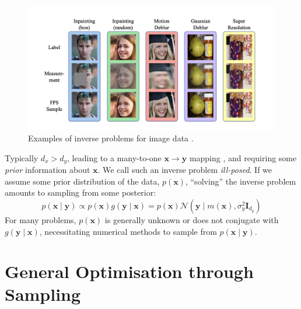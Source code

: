 \begin{figure}[htbp]
    \centering
    \includegraphics[width=1\textwidth]{assets/inverse_problems.png}
    \caption{Examples of inverse problems for image data \parencite{douDiffusionPosteriorSampling2023}.}
    \label{fig:inverse-problems}
\end{figure}

\begin{remark}
    Typically $d_x > d_y$, leading to a many-to-one $\mathbf{x} \rightarrow \mathbf{y}$ mapping
    \parencite{chungDiffusionPosteriorSampling2022}, and requiring some \emph{prior} information
    about $\mathbf{x}$. We call such an inverse problem \emph{ill-posed}. If we assume some prior
    distribution of the data, $p(\mathbf{x})$, ``solving'' the inverse problem amounts to sampling
    from some posterior:
    \begin{equation*}
        p(\mathbf{x} \mid \mathbf{y}) \propto p(\mathbf{x})g(\mathbf{y} \mid \mathbf{x})
        = p(\mathbf{x})\mathcal{N}\left(\mathbf{y} \mid m(\mathbf{x}), \sigma^2_y\mathbf{I}_{d_y}\right)
    \end{equation*}
    For many problems, $p(\mathbf{x})$ is generally unknown or does not conjugate with
    $g(\mathbf{y} \mid \mathbf{x})$, necessitating numerical methods to sample from
    $p(\mathbf{x} \mid \mathbf{y})$.
\end{remark}

\section{General Optimisation through Sampling}\label{sec:general-optimisation}

